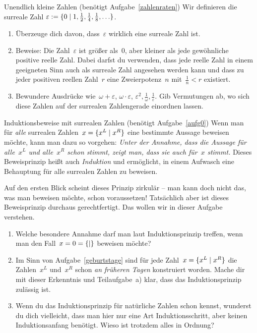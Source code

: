 \documentclass{../zirkelblatt}
\begin{document}
\begin{aufgabe}{Unendlich kleine Zahlen (benötigt Aufgabe~\ref{zahlenraten})}
\label{infinitesimal}
Wir definieren die surreale Zahl
$\varepsilon := \{ 0 \mathrel{|} 1, \tfrac{1}{2}, \tfrac{1}{4}, \tfrac{1}{8}, \ldots \}$.
\begin{enumerate}
\item Überzeuge dich davon, dass~$\varepsilon$ wirklich eine surreale Zahl ist.
\item Beweise: Die Zahl~$\varepsilon$ ist größer als~$0$, aber kleiner als jede
gewöhnliche positive reelle Zahl. Dabei darfst du verwenden, dass jede reelle
Zahl in einem geeigneten Sinn auch als surreale Zahl angesehen werden kann und
dass zu jeder positiven reellen Zahl~$r$ eine Zweierpotenz~$n$
mit~$\tfrac{1}{n} < r$ existiert.
\item Bewundere Ausdrücke wie~$\omega + \varepsilon$, $\omega \cdot
\varepsilon$, $\varepsilon^2, \tfrac{1}{\omega}, \tfrac{1}{\varepsilon}$. Gib
Vermutungen ab, wo sich diese Zahlen auf der
surrealen Zahlengerade einordnen lassen.
\end{enumerate}
\end{aufgabe}

\begin{aufgabe}{Induktionsbeweise mit surrealen Zahlen (benötigt Aufgabe~\ref{aufg0})}
\label{induktionsbeweise}
Wenn man für \emph{alle} surrealen Zahlen~$x = \{ x^L \mathrel{|} x^R \}$ eine bestimmte Aussage
beweisen möchte, kann man dazu so vorgehen: \emph{Unter der Annahme, dass die Aussage für
alle~$x^L$ und alle~$x^R$ schon stimmt, zeigt man, dass sie auch für~$x$
stimmt.} Dieses Beweisprinzip heißt auch \emph{Induktion} und ermöglicht, in
einem Aufwasch eine Behauptung für alle surrealen Zahlen zu beweisen.

Auf den ersten Blick scheint dieses Prinzip zirkulär -- man kann doch nicht das,
was man beweisen möchte, schon voraussetzen! Tatsächlich aber ist dieses
Beweisprinzip durchaus gerechtfertigt. Das wollen wir in dieser Aufgabe verstehen.
\begin{enumerate}
\item Welche besondere Annahme darf man laut Induktionsprinzip treffen, wenn
man den Fall~$x = 0 = \{  \mathrel{|}  \}$ beweisen möchte?
\item Im Sinn von Aufgabe~\ref{geburtstage} sind für jede Zahl~$x =
\{ x^L \mathrel{|} x^R \}$ die Zahlen~$x^L$ und~$x^R$
schon \emph{an früheren Tagen} konstruiert worden. Mache dir mit dieser Erkenntnis
und Teilaufgabe~a) klar, dass das Induktionsprinzip zulässig ist.
\item Wenn du das Induktionsprinzip für natürliche Zahlen schon kennst,
wunderst du dich vielleicht, dass man hier nur eine Art Induktionsschritt, aber
keinen Induktionsanfang benötigt. Wieso ist trotzdem alles in Ordnung?
\end{enumerate}
\end{aufgabe}
\end{document}
